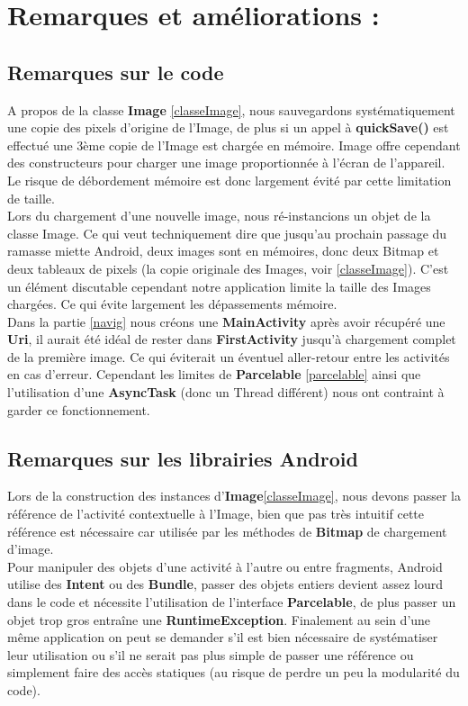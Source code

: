 \section{Remarques et améliorations  :}

\subsection{Remarques sur le code}
A propos de la classe \textbf{Image} \ref{classeImage}, nous sauvegardons systématiquement une copie des pixels d'origine de l'Image, de plus si un appel à \textbf{quickSave()} est effectué une 3ème copie de l'Image est chargée en mémoire. Image offre cependant des constructeurs pour charger une image proportionnée à l'écran de l'appareil. Le risque de débordement mémoire est donc largement évité par cette limitation de taille.
\\

Lors du chargement d'une nouvelle image, nous ré-instancions un objet de la classe Image. Ce qui veut techniquement dire que jusqu'au prochain passage du ramasse miette Android, deux images sont en mémoires, donc deux Bitmap et deux tableaux de pixels (la copie originale des Images, voir \ref{classeImage}). C'est un élément discutable cependant notre application limite la taille des Images chargées. Ce qui évite largement les dépassements mémoire.
\\

Dans la partie \ref{navig} nous créons une \textbf{MainActivity} après avoir récupéré une \textbf{Uri}, il aurait été idéal de rester dans \textbf{FirstActivity} jusqu'à chargement complet de la première image. Ce qui éviterait un éventuel aller-retour entre les activités en cas d'erreur. Cependant les limites de \textbf{Parcelable} \ref{parcelable} ainsi que l'utilisation d'une \textbf{AsyncTask} (donc un Thread différent) nous ont contraint à garder ce fonctionnement.

\subsection{Remarques sur les librairies Android}
Lors de la construction des instances d'\textbf{Image}\ref{classeImage}, nous devons passer la référence de l'activité contextuelle à l'Image, bien que pas très intuitif cette référence est nécessaire car utilisée par les méthodes de \textbf{Bitmap} de chargement d'image.
\\

\label{parcelable}
Pour manipuler des objets d'une activité à l'autre ou entre fragments, Android utilise des \textbf{Intent} ou des \textbf{Bundle}, passer des objets entiers devient assez lourd dans le code et nécessite l'utilisation de l'interface \textbf{Parcelable}, de plus passer un objet trop gros entraîne une \textbf{RuntimeException}. Finalement au sein d'une même application on peut se demander s'il est bien nécessaire de systématiser leur utilisation ou s'il ne serait pas plus simple de passer une référence ou simplement faire des accès statiques (au risque de perdre un peu la modularité du code).

